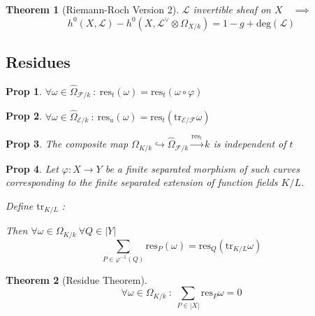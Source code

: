 \documentclass[a4paper, 12pt]{article}
\newcommand{\ca}[1]{\mathcal{#1}}
\newcommand{\caf}{\mathcal{F}}
\newcommand{\cl}{\mathcal{L}}
\newtheorem*{prop}{Prop}
\newtheorem*{thm}{Theorem}
\DeclareMathOperator{\id}{id}
\begin{document}
	\begin{thm}[Riemann-Roch Version 2]
		$ \ca{L}  $ invertible sheaf on $ X \quad \implies $
		\[ h^0(X, \cl) - h^0(X, \cl^{\vee} \otimes \Omega_{X/k}) = 1 -g + \mathrm{deg}(\cl) \] 
	\end{thm}
	
	
	
	
	\subsection{Residues}
	
	\begin{prop}
		$ \forall \omega \in \widehat{\Omega}_{\caf/k} \: : \: \mathrm{res}_t(\omega) = \mathrm{res}_t(\omega \circ \varphi) $
	\end{prop}
	
	\begin{prop}
			$ \forall \omega \in \widehat{\Omega}_{\ca{E}/k} \: : \: \mathrm{res}_u(\omega) = \mathrm{res}_t(\mathrm{tr}_{\ca{E}/\caf} \omega )   $
	\end{prop}
	
	\begin{prop}
		The composite map $ \Omega_{K/k} \hookrightarrow \widehat{\Omega}_{\caf/k} \xrightarrow{\mathrm{res}_t} k $ is independent of $ t $
	\end{prop}
	
	\begin{prop}
		Let $ \varphi : X \rightarrow Y $ be a finite separated morphism of such curves corresponding to the finite separated extension of function fields $ K/L $.
		
		Define $ \mathrm{tr}_{K/L} $ : 
		
		Then $ \forall \omega \in \Omega_{K/k} \: \forall Q \in |Y| $
		\[ \underset{P\in \varphi^{-1}(Q)}{\sum} \mathrm{res}_P (\omega) = \mathrm{res}_Q (\mathrm{tr}_{K/L} \omega) \]
		
	\end{prop}
	
	\begin{thm}[Residue Theorem]
		\[ \forall \omega \in \Omega_{K/k} \: : \: \underset{P \in |X|}{\sum} \mathrm{res}_P \omega =0 \]
	\end{thm}
	
\end{document}
